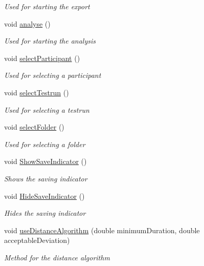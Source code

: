 \begin{DoxyCompactItemize}
\begin{DoxyCompactList}\small\item\em Used for starting the export \end{DoxyCompactList}\item 
void \hyperlink{class_web_analyzer_1_1_u_i_1_1_interaction_objects_1_1_analysis_export_control_a6696015a547f10cae60a7703c4ec1819}{analyse} ()
\begin{DoxyCompactList}\small\item\em Used for starting the analysis \end{DoxyCompactList}\item 
void \hyperlink{class_web_analyzer_1_1_u_i_1_1_interaction_objects_1_1_analysis_export_control_aa6c46c4213a2c07af6f40d6bc9fe7fdd}{select\+Participant} ()
\begin{DoxyCompactList}\small\item\em Used for selecting a participant \end{DoxyCompactList}\item 
void \hyperlink{class_web_analyzer_1_1_u_i_1_1_interaction_objects_1_1_analysis_export_control_a657be9be6841e03ea141377622cb50f1}{select\+Testrun} ()
\begin{DoxyCompactList}\small\item\em Used for selecting a testrun \end{DoxyCompactList}\item 
void \hyperlink{class_web_analyzer_1_1_u_i_1_1_interaction_objects_1_1_analysis_export_control_adc83e194f06035232900d4a37ff5b7c5}{select\+Folder} ()
\begin{DoxyCompactList}\small\item\em Used for selecting a folder \end{DoxyCompactList}\item 
void \hyperlink{class_web_analyzer_1_1_u_i_1_1_interaction_objects_1_1_analysis_export_control_aacb447300e2c8656dd8dae25486e84e9}{Show\+Save\+Indicator} ()
\begin{DoxyCompactList}\small\item\em Shows the saving indicator \end{DoxyCompactList}\item 
void \hyperlink{class_web_analyzer_1_1_u_i_1_1_interaction_objects_1_1_analysis_export_control_ae0cebcc416faad0fc25e97969f567f59}{Hide\+Save\+Indicator} ()
\begin{DoxyCompactList}\small\item\em Hides the saving indicator \end{DoxyCompactList}\item 
void \hyperlink{class_web_analyzer_1_1_u_i_1_1_interaction_objects_1_1_analysis_export_control_a3ab30329d20435c760ac9c6e21a796d6}{use\+Distance\+Algorithm} (double minimum\+Duration, double acceptable\+Deviation)
\begin{DoxyCompactList}\small\item\em Method for the distance algorithm \end{DoxyCompactList}\end{DoxyCompactItemize}
